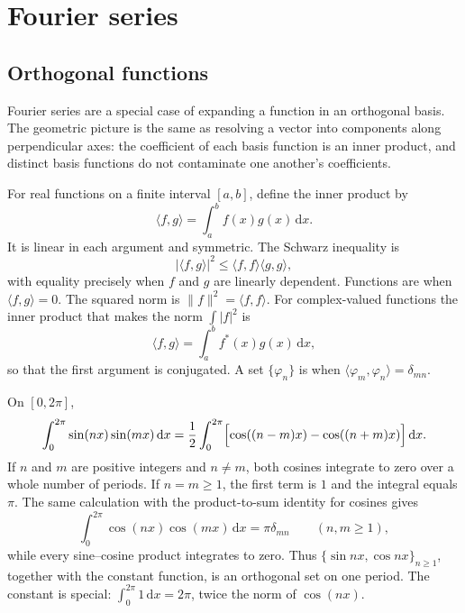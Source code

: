 \section{Fourier series}

\subsection{Orthogonal functions}

Fourier series are a special case of expanding a function in an orthogonal basis. The geometric picture is the same as resolving a vector into components along perpendicular axes: the coefficient of each basis function is an inner product, and distinct basis functions do not contaminate one another's coefficients.

For real functions on a finite interval $[a,b]$, define the inner product by
\begin{equation}
\langle f,g\rangle=\int_a^b f(x)g(x)\,\mathrm{d}x.
\label{eq:ch05-inner}
\end{equation}
It is linear in each argument and symmetric. The Schwarz inequality is
\begin{equation}
|\langle f,g\rangle|^2\leq\langle f,f\rangle\langle g,g\rangle,
\end{equation}
with equality precisely when $f$ and $g$ are linearly dependent. Functions are  when $\langle f,g\rangle=0$. The squared norm is $\lVert f\rVert^2=\langle f,f\rangle$. For complex-valued functions the inner product that makes the norm $\int|f|^2$ is
\begin{equation}
\langle f,g\rangle=\int_a^b f^*(x)g(x)\,\mathrm{d}x,
\end{equation}
so that the first argument is conjugated. A set $\{\varphi_n\}$ is  when $\langle\varphi_m,\varphi_n\rangle=\delta_{mn}$.

\begin{example}
On $[0,2\pi]$,
\begin{equation}
\int_0^{2\pi}\sin(nx)\sin(mx)\,\mathrm{d}x
=\frac12\int_0^{2\pi}\Bigl[\cos((n-m)x)-\cos((n+m)x)\Bigr]\,\mathrm{d}x.
\end{equation}
If $n$ and $m$ are positive integers and $n\neq m$, both cosines integrate to zero over a whole number of periods. If $n=m\geq 1$, the first term is $1$ and the integral equals $\pi$. The same calculation with the product-to-sum identity for cosines gives
\begin{equation}
\int_0^{2\pi}\cos(nx)\cos(mx)\,\mathrm{d}x=\pi\delta_{mn}
\qquad(n,m\geq 1),
\end{equation}
while every sine--cosine product integrates to zero. Thus $\{\sin nx,\cos nx\}_{n\geq 1}$, together with the constant function, is an orthogonal set on one period. The constant is special: $\int_0^{2\pi}1\,\mathrm{d}x=2\pi$, twice the norm of $\cos(nx)$.
\end{example}

